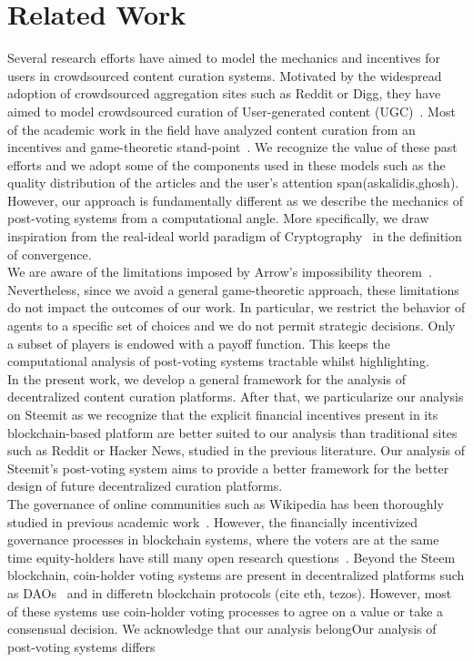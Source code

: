 \section{Related Work}
  Several research efforts have aimed to model the mechanics and incentives for users in crowdsourced content curation systems. Motivated by the widespread adoption of crowdsourced aggregation sites such as Reddit or Digg, they have aimed to model crowdsourced curation of User-generated content (UGC)~\cite{askalidis2013theoretical}. Most of the academic work in the field have analyzed content curation from an incentives and game-theoretic stand-point~\cite{ghosh2011incentivizing,das2010ranking,gupte2009news}. We recognize the value of these past efforts and we adopt some of the components used in these models such as the quality distribution of the articles and the user's attention span(askalidis,ghosh). However, our approach is fundamentally different as we describe the mechanics of post-voting systems from a computational angle. More specifically, we draw inspiration from the real-ideal world paradigm of Cryptography~\cite{lindell} in the definition of convergence.\\
  
  We are aware of the limitations imposed by Arrow's impossibility theorem~\cite{arrow1950difficulty}. Nevertheless, since we avoid a general game-theoretic approach, these limitations do not impact the outcomes of our work. In particular, we restrict the behavior of agents to a specific set of choices and we do not permit strategic decisions. Only a subset of players is endowed with a payoff function. This keeps the computational analysis of post-voting systems tractable whilst highlighting.\\

  
  In the present work, we develop a general framework for the analysis of decentralized content curation platforms. After that, we particularize our analysis on Steemit as we recognize that the explicit financial incentives present in its blockchain-based platform are better suited to our analysis than traditional sites such as Reddit or Hacker News, studied in the previous literature.  Our analysis of Steemit's post-voting system aims to provide a better framework for the better design of future decentralized curation platforms.\\ 
  
  The governance of online communities such as Wikipedia has been thoroughly studied in previous academic work~\cite{leskovec2010governance,forte2008scaling}. However, the financially incentivized governance processes in blockchain systems, where the voters are at the same time equity-holders have still many open research questions~\cite{vitalik, ehrsam}. Beyond the Steem blockchain, coin-holder voting systems are present in decentralized platforms such as DAOs~\cite{darkdaos} and in differetn blockchain protocols (cite eth, tezos). However, most of these systems use coin-holder voting processes to agree on a value or take a consensual decision. We acknowledge that our analysis belongOur analysis of post-voting systems differs
  
  
